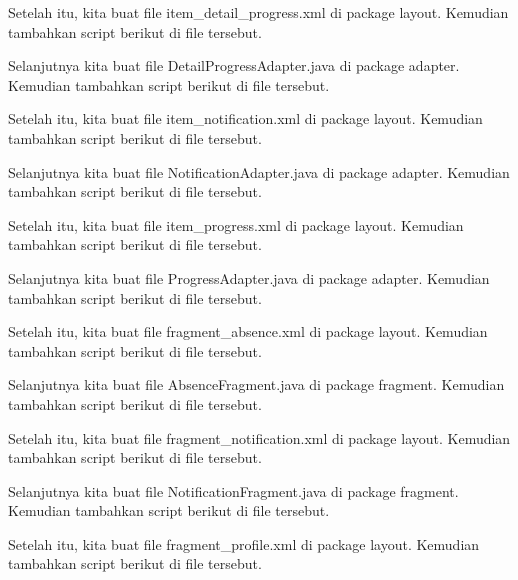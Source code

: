 Setelah itu, kita buat file item\_detail\_progress.xml di package layout. Kemudian tambahkan script berikut di file tersebut.


Selanjutnya kita buat file DetailProgressAdapter.java di package adapter. Kemudian tambahkan script berikut di file tersebut.


Setelah itu, kita buat file item\_notification.xml di package layout. Kemudian tambahkan script berikut di file tersebut.


Selanjutnya kita buat file NotificationAdapter.java di package adapter. Kemudian tambahkan script berikut di file tersebut.


Setelah itu, kita buat file item\_progress.xml di package layout. Kemudian tambahkan script berikut di file tersebut.


Selanjutnya kita buat file ProgressAdapter.java di package adapter. Kemudian tambahkan script berikut di file tersebut.


Setelah itu, kita buat file fragment\_absence.xml di package layout. Kemudian tambahkan script berikut di file tersebut.


Selanjutnya kita buat file AbsenceFragment.java di package fragment. Kemudian tambahkan script berikut di file tersebut.


Setelah itu, kita buat file fragment\_notification.xml di package layout. Kemudian tambahkan script berikut di file tersebut.


Selanjutnya kita buat file NotificationFragment.java di package fragment. Kemudian tambahkan script berikut di file tersebut.


Setelah itu, kita buat file fragment\_profile.xml di package layout. Kemudian tambahkan script berikut di file tersebut.


